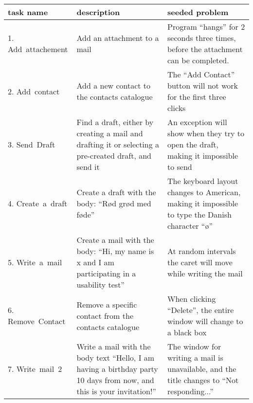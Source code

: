 \begin{table}[h]
  \centering
  \begin{tabular}[c]{|p{60pt}|p{80pt}|p{80pt}|}
    \hline
    task name                         & description                                                                                                                    & seeded problem                                                                                           \\ \hline
    \small{1. Add~attachement}        & \small{Add an attachment to a mail}                                                                                            & \small{Program ``hangs'' for 2 seconds three times, before the attachment can be completed.}             \\ \hline
    \small{2. Add~contact}            & \small{Add a new contact to the contacts catalogue}                                                                            & \small{The ``Add Contact'' button will not work for the first three clicks}                              \\ \hline
    \small{3. Send~Draft}             & \small{Find a draft, either by creating a mail and drafting it or selecting a pre-created draft, and send it}                  & \small{An exception will show when they try to open the draft, making it impossible to send}             \\ \hline
    \small{4. Create~a~draft}         & \small{Create a draft with the body: ``Rød grød med føde''}                                                                    & \small{The keyboard layout changes to American, making it impossible to type the Danish character ``ø''} \\ \hline
    \small{5. Write~a~mail}           & \small{Create a mail with the body: ``Hi, my name is x and I am participating in a usability test''}                           & \small{At random intervals the caret will move while writing the mail}                                   \\ \hline
    \small{6. Remove~Contact}         & \small{Remove a specific contact from the contacts catalogue}                                                                  & \small{When clicking ``Delete'', the entire window will change to a black box}                           \\ \hline
    \small{7. Write~mail~2}           & \small{Write a mail with the body text ``Hello, I am having a birthday party 10 days from now, and this is your invitation!''} & \small{The window for writing a mail is unavailable, and the title changes to ``Not responding...''}     \\ \hline

\end{tabular}
\end{table}
